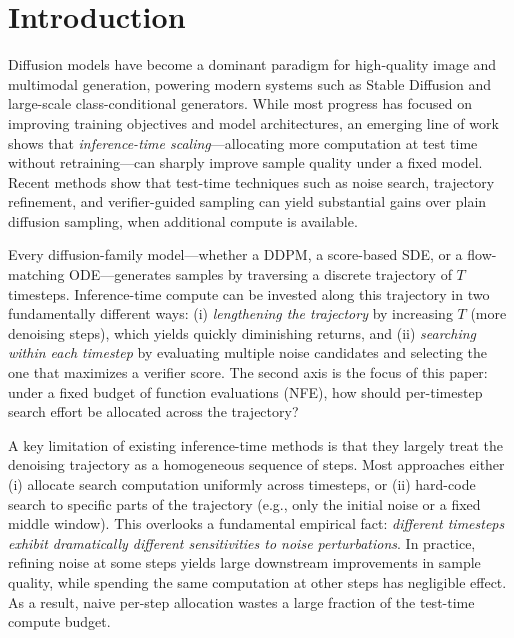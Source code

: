 \section{Introduction}
\label{sec:intro}

Diffusion models have become a dominant paradigm for high-quality image and
multimodal generation, powering modern systems such as Stable Diffusion and
large-scale class-conditional generators.
While most progress has focused on improving training objectives and model
architectures, an emerging line of work shows that \emph{inference-time
scaling}---allocating more computation at test time without retraining---can
sharply improve sample quality under a fixed model.
Recent methods show that test-time techniques such as noise search,
trajectory refinement, and verifier-guided sampling can yield substantial gains
over plain diffusion sampling, when additional compute is available.

Every diffusion-family model---whether a DDPM, a score-based SDE, or a
flow-matching ODE---generates samples by traversing a discrete trajectory
of $T$ timesteps.
Inference-time compute can be invested along this trajectory in two
fundamentally different ways:
(i) \emph{lengthening the trajectory} by increasing $T$ (more denoising
steps), which yields quickly diminishing returns, and
(ii) \emph{searching within each timestep} by evaluating multiple noise
candidates and selecting the one that maximizes a verifier score.
The second axis is the focus of this paper: under a fixed budget of function
evaluations (NFE), how should per-timestep search effort be allocated across
the trajectory?

A key limitation of existing inference-time methods is that they
largely treat the denoising trajectory as a homogeneous sequence of steps.
Most approaches either (i) allocate search computation uniformly across
timesteps, or (ii) hard-code search to specific parts of the trajectory
(e.g., only the initial noise or a fixed middle window).
This overlooks a fundamental empirical fact: \emph{different timesteps exhibit
dramatically different sensitivities to noise perturbations}.
In practice, refining noise at some steps yields large downstream improvements
in sample quality, while spending the same computation at other steps has
negligible effect.
As a result, naive per-step allocation wastes a large fraction of the
test-time compute budget.

